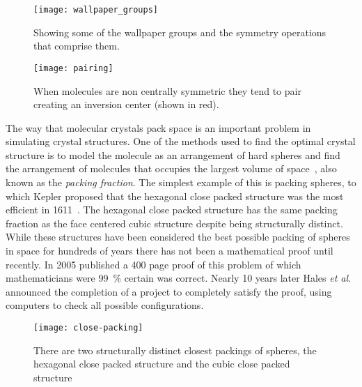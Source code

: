 \begin{figure}
    \centering
    \texttt{[image: wallpaper\_groups]}
    \caption{Showing some of the wallpaper groups and the symmetry operations that comprise them.}
    \label{fig:wallpaper}
\end{figure}

\begin{figure}
    \centering
    \texttt{[image: pairing]}
    \caption{When molecules are non centrally symmetric they tend to pair creating an inversion center (shown in red).}
    \label{fig:molecule pair}
\end{figure}

The way that molecular crystals pack space is an important problem in simulating crystal structures. One of the methods used to find the optimal crystal structure is to model the molecule as an arrangement of hard spheres and find the arrangement of molecules that occupies the largest volume of space~\cite{kitaigorodskii:73}, also known as the \emph{packing fraction}. The simplest example of this is packing spheres, to which Kepler proposed that the hexagonal close packed structure was the most efficient in 1611~\cite{kepler:1611}. The hexagonal close packed structure has the same packing fraction as the face centered cubic structure despite being structurally distinct. While these structures have been considered the best possible packing of spheres in space for hundreds of years there has not been a mathematical proof until recently. In 2005 \textcite{hales:05} published a 400 page proof of this problem of which mathematicians were \SI{99}{\percent} certain was correct. Nearly 10 years later Hales {\em et al.}~\cite{hales:14} announced the completion of a project to completely satisfy the proof, using computers to check all possible configurations. 

\begin{figure}
    \texttt{[image: close-packing]}
    \caption{There are two structurally distinct closest packings of spheres, the hexagonal close packed structure and the cubic close packed structure}
    \label{fig:sphere packing}
\end{figure}

